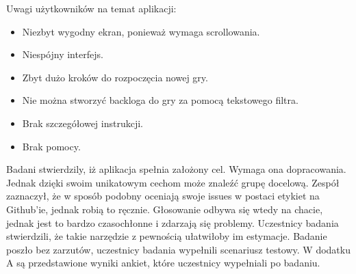 Uwagi użytkowników na temat aplikacji:
\begin{itemize}
	\item Niezbyt wygodny ekran, ponieważ wymaga scrollowania.
	\item Niespójny interfejs.
	\item Zbyt dużo kroków do rozpoczęcia nowej gry.
	\item Nie można stworzyć backloga do gry za pomocą tekstowego filtra.
	\item Brak szczegółowej instrukcji.
	\item Brak pomocy.
\end{itemize}

Badani stwierdzily, iż aplikacja spełnia założony cel.
Wymaga ona dopracowania.
Jednak dzięki swoim unikatowym cechom może znaleźć grupę docelową.
Zespół zaznaczył, że w sposób podobny oceniają swoje issues w postaci etykiet na Github'ie,
jednak robią to ręcznie.
Głosowanie odbywa się wtedy na chacie, jednak jest to bardzo czasochłonne i zdarzają się problemy.
Uczestnicy badania stwierdzili, że takie narzędzie z pewnością ułatwiłoby im estymacje.
Badanie poszło bez zarzutów, uczestnicy badania wypełnili scenariusz testowy.
W dodatku A są przedstawione wyniki ankiet, które uczestnicy wypełniali po badaniu.